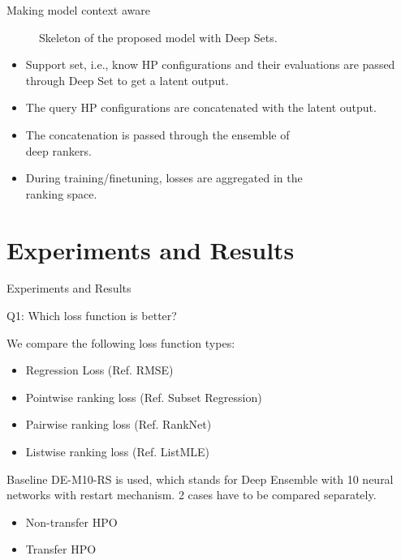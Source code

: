 \documentclass{beamer}
\begin{document}
\begin{frame}[t]{Making model context aware}
\begin{figure}[htb]
\begin{tikzpicture}
\end{tikzpicture}
\caption{Skeleton of the proposed model with Deep Sets.}
\label{fig:proposeModelDeepSets}
\end{figure}

\begin{itemize}
\item Support set, i.e., know HP configurations and their evaluations are passed through Deep Set to get a latent output.
\item The query HP configurations are concatenated with the latent output.
\item The concatenation is passed through the ensemble of \\
deep rankers.
\item During training/finetuning, losses are aggregated in the\\
 ranking space.
\end{itemize}

\end{frame}


\section{Experiments and Results}
\begin{frame}

\centering
\LARGE{Experiments and Results}

\end{frame}

\begin{frame}[t]{Q1: Which loss function is better?}

We compare the following loss function types:
\begin{itemize}
\item Regression Loss (Ref.  RMSE)
\item Pointwise ranking loss (Ref.  Subset Regression)
\item Pairwise ranking loss (Ref.  RankNet)
\item Listwise ranking loss (Ref.  ListMLE)
\end{itemize}
Baseline DE-M10-RS is used, which stands for Deep Ensemble with 10 neural networks with restart mechanism.
2 cases have to be compared separately.
\begin{itemize}
\item Non-transfer HPO
\item Transfer HPO
\end{itemize}


\end{frame}
\end{document}
